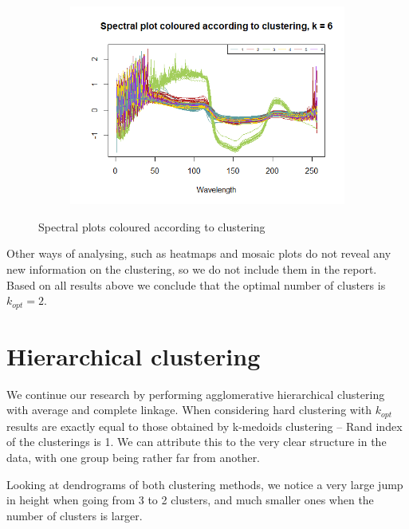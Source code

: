 \documentclass[12pt]{article}
\begin{document}
\begin{figure}[h!]
\begin{subfigure}[b]{0.33\linewidth}
 \includegraphics[width=\textwidth]{../images/project2/spectraByClusters_pam6.png}
 \caption{}\label{fig:spectraByClusters_pam6}
\end{subfigure}%
\caption{Spectral plots coloured according to clustering}
\label{fig:spectraByClusters}
\end{figure}

Other ways of analysing, such as heatmaps and mosaic plots do not reveal any new information on the clustering, so we do not include them in the report.
Based on all results above we conclude that the optimal number of clusters is $k_{opt} = 2$.

\section{Hierarchical clustering}

We continue our research by performing agglomerative hierarchical clustering with average and complete linkage. When considering hard clustering with $k_{opt}$ 
results are exactly equal to those obtained by k-medoids clustering -- Rand index of the clusterings is 1.
We can attribute this to the very clear structure in the data, with one group being rather far from another.

Looking at dendrograms of both clustering methods, we notice a very large jump in height when going from 3 to 2 clusters, and much smaller ones 
when the number of clusters is larger.
\end{document}
